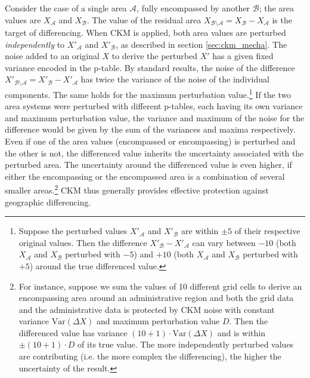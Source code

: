 Consider the case of a single area $\mathcal{A}$, fully encompassed by another $\mathcal{B}$; the area values are $X_{\mathcal{A}}$ and $X_{\mathcal{B}}$. The value of the residual area $X_{\mathcal{B}\setminus\mathcal{A}} = X_{\mathcal{B}} - X_{\mathcal{A}}$ is the target of differencing. When CKM is applied, both area values are perturbed \emph{independently} to $X'_{\mathcal{A}}$ and $X'_{\mathcal{B}}$, as described in section \ref{sec:ckm_mecha}. The noise %
added to an original $X$ to derive  the perturbed $X'$ has a given fixed variance encoded in the p-table.
By standard results, the noise of the difference $X'_{\mathcal{B}\setminus{\mathcal{A}}} = X'_{\mathcal{B}} - X'_{\mathcal{A}}$ has twice the variance of the noise of the individual components.
The same holds for the maximum perturbation value.\footnote{
    Suppose the perturbed values $X'_{\mathcal{A}}$ and $X'_{\mathcal{B}}$ are within $\pm 5$ of their respective original values. Then the difference $X'_{\mathcal{B}} - X'_{\mathcal{A}}$ can vary between $-10$ (both $X_{\mathcal{A}}$ and $X_{\mathcal{B}}$ perturbed with $-5$) and $+10$ (both $X_{\mathcal{A}}$ and $X_{\mathcal{B}}$ perturbed with $+5$) around the true differenced value.}
If the two area systems were perturbed with different p-tables, each having its own variance and maximum perturbation value, the variance and maximum of the noise for the difference would be given by the sum of the variances and maxima respectively. Even if one of the area values (encompassed or encompassing) is perturbed and the other is not, the differenced value inherits the uncertainty associated with the perturbed area. 
The uncertainty around the differenced value is even higher, if either the encompassing or the encompassed area is a combination of several smaller areas.\footnote{
    For instance, suppose we sum the values of 10 different grid cells to derive an encompassing area around an administrative region and both the grid data and the administrative data is protected by CKM noise with constant variance $\mathrm{Var}(\Delta X)$ and maximum perturbation value $D$. Then the differenced value has variance $(10 + 1) \cdot \mathrm{Var}(\Delta X)$ and is within $\pm (10 + 1) \cdot D$ of its true value. The more independently perturbed values are contributing (i.e. the more complex the differencing), the higher the uncertainty of the result.}
CKM thus generally provides effective protection against geographic differencing.\\

